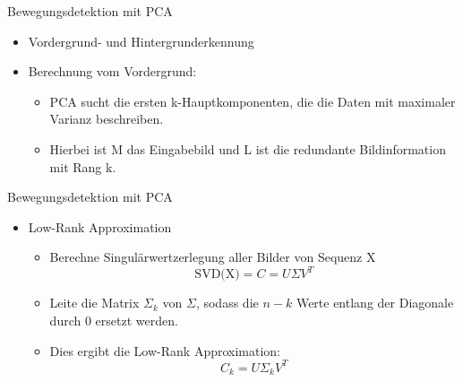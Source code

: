 \begin{frame}[t,fragile]{Bewegungsdetektion mit PCA}
	\begin{itemize}
 \item Vordergrund- und Hintergrunderkennung
 \item Berechnung vom Vordergrund:
 \begin{itemize}
  \item{PCA sucht die ersten k-Hauptkomponenten, die die Daten mit maximaler Varianz beschreiben.}
  \item{Hierbei ist M das Eingabebild und L ist die redundante Bildinformation mit Rang k.} 
 \end{itemize}
\end{itemize}
  
\end{frame}


\begin{frame}[t,fragile]{Bewegungsdetektion mit PCA}
	\begin{itemize}
    \item{Low-Rank Approximation}
\begin{itemize}
    
 \item{Berechne Singulärwertzerlegung aller Bilder von Sequenz X}
 \begin{equation}
\text{SVD(X)}= C = U\Sigma V^T
\end{equation}
 \item{Leite die Matrix ${\Sigma_k}$ von ${\Sigma}$, sodass die ${n - k}$ Werte entlang der Diagonale durch 0 ersetzt werden.}
 \item{Dies ergibt die Low-Rank Approximation:}
\begin{equation}
C_k = U\Sigma_kV^T
\end{equation}

      \end{itemize}
  \end{itemize}
\end{frame}


